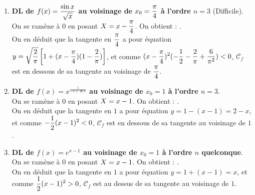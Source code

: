 \documentclass[a4paper, 11pt,reqno]{article}
\begin{document}
\begin{correction}
\begin{enumerate}
		      On en d\'eduit que la tangente en $3$ a pour \'equation $y=2-\ddp\frac{1}{2}(x-3)$, et comme $\ddp\frac{1}{4}(x-3)^2 > 0$, $\mathcal{C}_f$ est au dessus de sa tangente au voisinage de $1$.
		\item \textbf{DL de $f(x)=\displaystyle\frac{\sin{x}}{\sqrt{x}}$ au voisinage de $x_0=\displaystyle\frac{\pi}{4}$ \`a l'ordre $n=3$} (Difficile).\\
		      On se ram\`ene \`a $0$ en posant $\displaystyle X=x-\displaystyle\frac{\pi}{4}$. On obtient :
		      \hspace*{-1cm} .\\
		      On en d\'eduit que la tangente en $\displaystyle\frac{\pi}{4}$ a pour \'equation $y=\displaystyle\sqrt{\displaystyle\frac{2}{\pi}}\left\lbrack
			      1+(x-\displaystyle\frac{\pi}{4})(1-\displaystyle\frac{2}{\pi})\right]$, et comme $(x-\displaystyle\frac{\pi}{4})^2(-\displaystyle\frac{1}{2}-\displaystyle\frac{2}{\pi}+\displaystyle\frac{6}{\pi^2})<0$, $\mathcal{C}_f$ est en dessous de sa tangente au voisinage de $\displaystyle\frac{\pi}{4}$.
		\item \textbf{DL de $f(x)=x^{\frac{1}{-1+\ln{x}}}$ au voisinage de $x_0=1$ \`a l'ordre $n=3$}.\\
		      On se ram\`ene \`a $0$ en posant $\displaystyle X=x-1$. On obtient :
		      .\\
		      On en d\'eduit que la tangente en $1$ a pour \'equation $y=1-(x-1)=2-x$, et comme $-\displaystyle\frac{1}{2} (x-1)^2<0$, $\mathcal{C}_f$ est en dessous de sa tangente au voisinage de $1$.
		\item \textbf{DL de $f(x)=e^{x-1}$ au voisinage de $x_0=1$ \`a l'ordre $n$ quelconque}.\\
		      On se ram\`ene \`a $0$ en posant $\displaystyle X=x-1$. On obtient :
		      .\\
		      On en d\'eduit que la tangente en $1$ a pour \'equation $y=1+(x-1)=x$, et comme $\displaystyle\frac{1}{2} (x-1)^2 > 0$, $\mathcal{C}_f$ est au dessus de sa tangente au voisinage de $1$.

\end{enumerate}
\end{correction}
\end{document}
